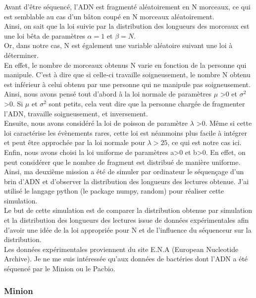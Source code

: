 \documentclass[11pt,a4paper]{article} %
\begin{document}
Avant d'être séquencé, l'ADN est fragmenté aléatoirement en N morceaux, ce qui est semblable au cas d'un bâton coupé en N morceaux aléatoirement.\\
Ainsi, on sait que la loi suivie par la distribution des longueurs des morceaux est une loi bêta de paramètres $\alpha=1$ et $\beta = N$. \\
Or, dans notre cas, N est également une variable aléatoire suivant une loi à déterminer.\\
En effet, le nombre de morceaux obtenus N varie en fonction de la personne qui manipule. C'est à dire que si celle-ci travaille soigneusement, le nombre N obtenu est inférieur à celui obtenu par une personne qui ne manipule pas soigneusement. \\
Ainsi, nous avons pensé tout d'abord à la loi normale de paramètres $\mu$ >0 et $\sigma^2$ >0. Si $\mu$ et $\sigma^2$ sont petits, cela veut dire que la personne chargée de fragmenter l'ADN, travaille soigneusement, et inversement. \\
Ensuite, nous avons considéré la loi de poisson de paramètre $\lambda$ >0. Même si cette loi caractérise les évènements rares, cette loi est néanmoins plus facile à intégrer et peut être approchée par la loi normale pour $\lambda>25$, ce qui est notre cas ici. \\
Enfin, nous avons choisi la loi uniforme de paramètres a>0 et b>0. En effet, on peut considérer que le nombre de fragment est distribué de manière uniforme.  \\
Ainsi, ma deuxième mission a été de simuler par ordinateur le séquençage d'un brin d'ADN et d'observer la distribution des longueurs des lectures obtenue. J'ai utilisé le langage python (le package numpy, random) pour réaliser cette simulation.\\
Le but de cette simulation est de comparer la distribution obtenue par simulation et la distribution des longueurs des lectures issue de données expérimentales afin d'avoir une idée de la loi appropriée pour N et de l'influence du séquenceur sur la distribution. \\
Les données expérimentales proviennent du site E.N.A (European Nucleotide Archive). Je ne me suis intéressée qu'aux données de bactéries dont l'ADN a été séquencé par le Minion ou le Pacbio. \\
\subsubsection{Minion}
\end{document}
